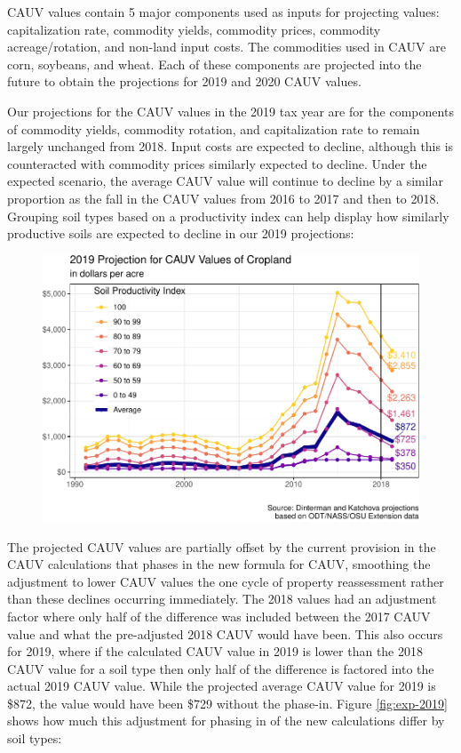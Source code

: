 \documentclass[]{article}
\begin{document}
CAUV values contain 5 major components used as inputs for projecting
values: capitalization rate, commodity yields, commodity prices,
commodity acreage/rotation, and non-land input costs. The commodities
used in CAUV are corn, soybeans, and wheat. Each of these components are
projected into the future to obtain the projections for 2019 and 2020
CAUV values.

Our projections for the CAUV values in the 2019 tax year are for the
components of commodity yields, commodity rotation, and capitalization
rate to remain largely unchanged from 2018. Input costs are expected to
decline, although this is counteracted with commodity prices similarly
expected to decline. Under the expected scenario, the average CAUV value
will continue to decline by a similar proportion as the fall in the CAUV
values from 2016 to 2017 and then to 2018. Grouping soil types based on
a productivity index can help display how similarly productive soils are
expected to decline in our 2019 projections:

\begin{figure}[H]
\includegraphics[width=1\linewidth]{4-projections-2019-2020_files/figure-latex/exp-trend-1} \caption{\label{fig:exp-trend}}\label{fig:exp-trend}
\end{figure}

The projected CAUV values are partially offset by the current provision
in the CAUV calculations that phases in the new formula for CAUV,
smoothing the adjustment to lower CAUV values the one cycle of property
reassessment rather than these declines occurring immediately. The 2018
values had an adjustment factor where only half of the difference was
included between the 2017 CAUV value and what the pre-adjusted 2018 CAUV
would have been. This also occurs for 2019, where if the calculated CAUV
value in 2019 is lower than the 2018 CAUV value for a soil type then
only half of the difference is factored into the actual 2019 CAUV value.
While the projected average CAUV value for 2019 is \$872, the value
would have been \$729 without the phase-in. Figure \ref{fig:exp-2019}
shows how much this adjustment for phasing in of the new calculations
differ by soil types:
\end{document}
